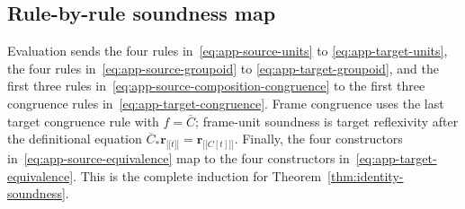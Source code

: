 \documentclass[10pt,reqno]{amsart}
\newcommand{\den}[1]{\mathopen{\lbrack\!\lbrack}#1\mathclose{\rbrack\!\rbrack}}
\begin{document}
\subsection{Rule-by-rule soundness map}

Evaluation sends the four rules in~\eqref{eq:app-source-units} to
\eqref{eq:app-target-units}, the four rules
in~\eqref{eq:app-source-groupoid} to
\eqref{eq:app-target-groupoid}, and the first three rules
in~\eqref{eq:app-source-composition-congruence} to the first three congruence
rules in~\eqref{eq:app-target-congruence}.  Frame congruence uses the last
target congruence rule with \(f=\overline C\); frame-unit soundness is target
reflexivity after the definitional equation
\(\overline C_\ast\mathbf r_{\den t}=\mathbf r_{\den{C[t]}}\).
Finally, the four constructors in~\eqref{eq:app-source-equivalence} map to
the four constructors in~\eqref{eq:app-target-equivalence}.  This is the
complete induction for Theorem~\ref{thm:identity-soundness}.

\begingroup
\small


\endgroup
\end{document}
